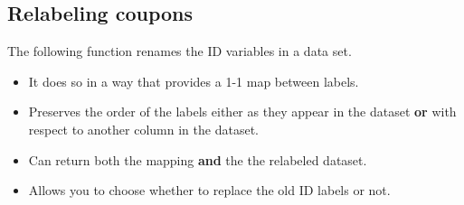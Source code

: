 \documentclass[10pt]{report}
\begin{document}
\subsection{Relabeling coupons}
The following function renames the ID variables in a data set.
\begin{itemize}
   \item It does so in a way that provides a 1-1 map between labels.
   \item Preserves the order of the labels either as they appear in the dataset \textbf{or} with respect to another column in the dataset.
   \item Can return both the mapping \textbf{and} the the relabeled dataset.
   \item Allows you to choose whether to replace the old ID labels or not.
\end{itemize}
\end{document}
